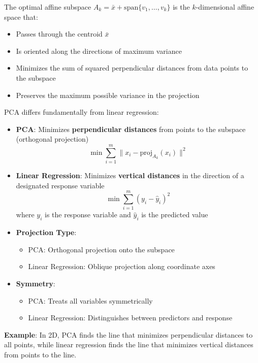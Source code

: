 \begin{notechapter}
\begin{remark}
The optimal affine subspace $A_k = \bar{x} + \text{span}\{v_1, \dots, v_k\}$ is the $k$-dimensional affine space that:
\begin{itemize}
    \item Passes through the centroid $\bar{x}$
    \item Is oriented along the directions of maximum variance
    \item Minimizes the sum of squared perpendicular distances from data points to the subspace
    \item Preserves the maximum possible variance in the projection
\end{itemize}
\end{remark}

\begin{remark}
PCA differs fundamentally from linear regression:
\begin{itemize}
    \item \textbf{PCA}: Minimizes \textbf{perpendicular distances} from points to the subspace (orthogonal projection)
    \[
    \min \sum_{i=1}^m \|x_i - \text{proj}_{A_k}(x_i)\|^2
    \]
    
    \item \textbf{Linear Regression}: Minimizes \textbf{vertical distances} in the direction of a designated response variable
    \[
    \min \sum_{i=1}^m (y_i - \hat{y}_i)^2
    \]
    where $y_i$ is the response variable and $\hat{y}_i$ is the predicted value
    
    \item \textbf{Projection Type}:
    \begin{itemize}
        \item PCA: Orthogonal projection onto the subspace
        \item Linear Regression: Oblique projection along coordinate axes
    \end{itemize}
    
    \item \textbf{Symmetry}: 
    \begin{itemize}
        \item PCA: Treats all variables symmetrically
        \item Linear Regression: Distinguishes between predictors and response
    \end{itemize}
\end{itemize}

\textbf{Example}: In 2D, PCA finds the line that minimizes perpendicular distances to all points, while linear regression finds the line that minimizes vertical distances from points to the line.
\end{remark}


\end{notechapter}
